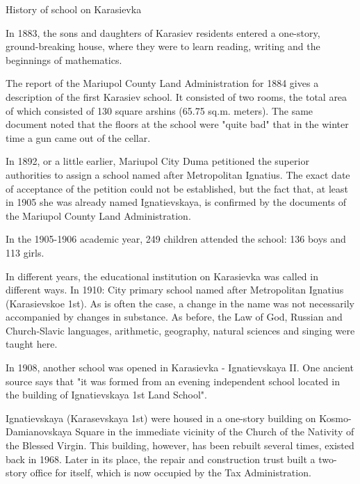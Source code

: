  
 
 
 
 

History of school on Karasievka

In 1883, the sons and daughters of Karasiev residents entered a one-story,
ground-breaking house, where they were to learn reading, writing and the
beginnings of mathematics.

The report of the Mariupol County Land Administration for 1884 gives a
description of the first Karasiev school. It consisted of two rooms, the total
area of which consisted of 130 square arshins (65.75 sq.m. meters). The same
document noted that the floors at the school were "quite bad" that in the
winter time a gun came out of the cellar.

In 1892, or a little earlier, Mariupol City Duma petitioned the superior
authorities to assign a school named after Metropolitan Ignatius. The exact
date of acceptance of the petition could not be established, but the fact that,
at least in 1905 she was already named Ignatievskaya, is confirmed by the
documents of the Mariupol County Land Administration.

In the 1905-1906 academic year, 249 children attended the school: 136 boys and
113 girls.

In different years, the educational institution on Karasievka was called in
different ways. In 1910: City primary school named after Metropolitan Ignatius
(Karasievskoe 1st). As is often the case, a change in the name was not
necessarily accompanied by changes in substance. As before, the Law of God,
Russian and Church-Slavic languages, arithmetic, geography, natural sciences
and singing were taught here.

In 1908, another school was opened in Karasievka - Ignatievskaya II. One
ancient source says that "it was formed from an evening independent school
located in the building of Ignatievskaya 1st Land School".

Ignatievskaya (Karasevskaya 1st) were housed in a one-story building on
Kosmo-Damianovskaya Square in the immediate vicinity of the Church of the
Nativity of the Blessed Virgin. This building, however, has been rebuilt
several times, existed back in 1968. Later in its place, the repair and
construction trust built a two-story office for itself, which is now occupied
by the Tax Administration.

